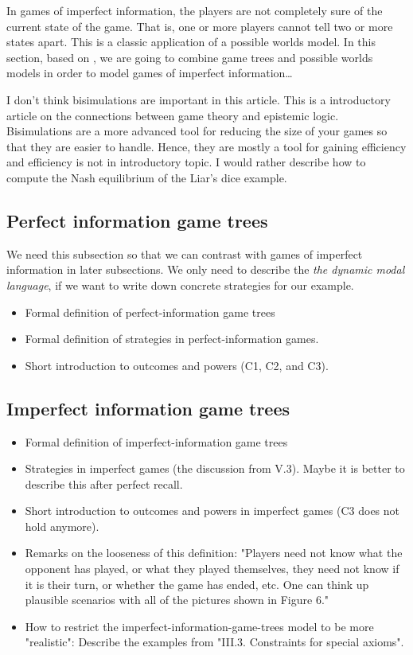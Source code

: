 In games of imperfect information, the players are not completely sure of the current state of the game. That is, one or more players cannot tell two or more states apart. This is a classic application of a possible worlds model. In this section, based on \cite{benthem2001a}, we are going to combine game trees and possible worlds models in order to model games of imperfect information\dots

{ \color{red} I don't think bisimulations are important in this article. This is a introductory article on the connections between game theory and epistemic logic. Bisimulations are a more advanced tool for reducing the size of your games so that they are easier to handle. Hence, they are mostly a tool for gaining efficiency and efficiency is not in introductory topic. I would rather describe how to compute the Nash equilibrium of the Liar's dice example. }

\subsection{Perfect information game trees}

{ \color{red} We need this subsection so that we can contrast with games of imperfect information in later subsections. We only need to describe the \emph{the dynamic modal language}, if we want to write down concrete strategies for our example. }

\begin{itemize} \color{red}
\item Formal definition of perfect-information game trees
\item Formal definition of strategies in perfect-information games.
\item Short introduction to outcomes and powers (C1, C2, and C3).
\end{itemize}

\subsection{Imperfect information game trees}

\begin{itemize} \color{red}
\item Formal definition of imperfect-information game trees
\item Strategies in imperfect games (the discussion from V.3). Maybe it is better to describe this after perfect recall.
\item Short introduction to outcomes and powers in imperfect games (C3 does not hold anymore).
\item Remarks on the looseness of this definition: "Players need not know what the opponent has played, or what they played themselves, they need not know if it is their turn, or whether the game has ended, etc. One can think up plausible scenarios with all of the pictures shown in Figure 6."
\item How to restrict the imperfect-information-game-trees model to be more "realistic": Describe the examples from "III.3. Constraints for special axioms".
\end{itemize}

